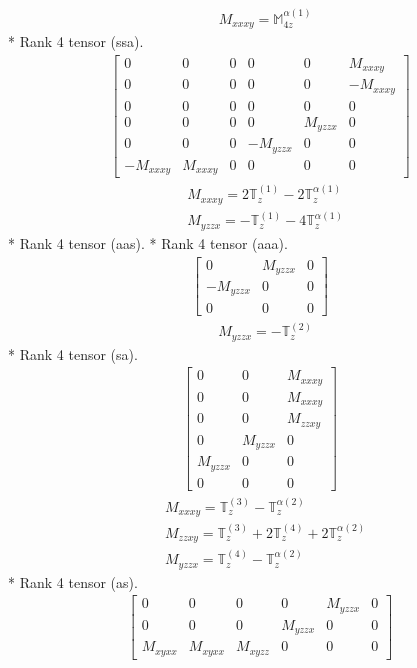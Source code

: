 \documentclass[fleqn,8pt,landscape]{jsarticle}
\begin{document}
\begin{align*}
& M_{xxxy} = \mathbb{M}_{4z}^{\alpha(1)}
\end{align*}
* Rank 4 tensor (ssa).
\begin{align*}
\begin{bmatrix} 0 & 0 & 0 & 0 & 0 & M_{xxxy} \\ 0 & 0 & 0 & 0 & 0 & - M_{xxxy} \\ 0 & 0 & 0 & 0 & 0 & 0 \\ 0 & 0 & 0 & 0 & M_{yzzx} & 0 \\ 0 & 0 & 0 & - M_{yzzx} & 0 & 0 \\ - M_{xxxy} & M_{xxxy} & 0 & 0 & 0 & 0 \end{bmatrix}
\end{align*}
\begin{align*}
& M_{xxxy} = 2 \mathbb{T}_{z}^{(1)} - 2 \mathbb{T}_{z}^{\alpha(1)} \\
& M_{yzzx} = - \mathbb{T}_{z}^{(1)} - 4 \mathbb{T}_{z}^{\alpha(1)}
\end{align*}
* Rank 4 tensor (aas).
* Rank 4 tensor (aaa).
\begin{align*}
\begin{bmatrix} 0 & M_{yzzx} & 0 \\ - M_{yzzx} & 0 & 0 \\ 0 & 0 & 0 \end{bmatrix}
\end{align*}
\begin{align*}
& M_{yzzx} = - \mathbb{T}_{z}^{(2)}
\end{align*}
* Rank 4 tensor (sa).
\begin{align*}
\begin{bmatrix} 0 & 0 & M_{xxxy} \\ 0 & 0 & M_{xxxy} \\ 0 & 0 & M_{zzxy} \\ 0 & M_{yzzx} & 0 \\ M_{yzzx} & 0 & 0 \\ 0 & 0 & 0 \end{bmatrix}
\end{align*}
\begin{align*}
& M_{xxxy} = \mathbb{T}_{z}^{(3)} - \mathbb{T}_{z}^{\alpha(2)} \\
& M_{zzxy} = \mathbb{T}_{z}^{(3)} + 2 \mathbb{T}_{z}^{(4)} + 2 \mathbb{T}_{z}^{\alpha(2)} \\
& M_{yzzx} = \mathbb{T}_{z}^{(4)} - \mathbb{T}_{z}^{\alpha(2)}
\end{align*}
* Rank 4 tensor (as).
\begin{align*}
\begin{bmatrix} 0 & 0 & 0 & 0 & M_{yzzx} & 0 \\ 0 & 0 & 0 & M_{yzzx} & 0 & 0 \\ M_{xyxx} & M_{xyxx} & M_{xyzz} & 0 & 0 & 0 \end{bmatrix}
\end{align*}
\end{document}
